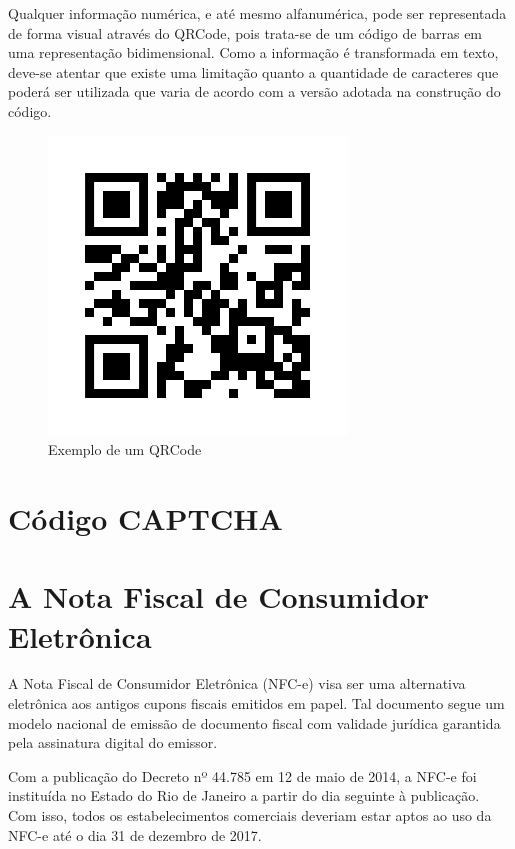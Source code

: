 Qualquer informação numérica, e até mesmo alfanumérica, pode ser representada de forma visual através do QRCode, pois trata-se de um código de barras em uma representação bidimensional. Como a informação é transformada em texto, deve-se atentar que existe uma limitação quanto a quantidade de caracteres que poderá ser utilizada que varia de acordo com a versão adotada na construção do código.

\begin{figure}[h]
    \centering
    \includegraphics[scale=0.5]{tcc/figures/exemplo-qrcode.png}
    \caption{Exemplo de um QRCode}
    \label{fig-exemplo-qrcode}
\end{figure}

\section{Código CAPTCHA}

\section{A Nota Fiscal de Consumidor Eletrônica}\label{secNfce}

A Nota Fiscal de Consumidor Eletrônica (NFC-e) visa ser uma alternativa eletrônica aos antigos cupons fiscais emitidos em papel. Tal documento segue um modelo nacional de emissão de documento fiscal com validade jurídica garantida pela assinatura digital do emissor.

Com a publicação do Decreto nº 44.785 em 12 de maio de 2014, a NFC-e foi instituída no Estado do Rio de Janeiro a partir do dia seguinte à publicação. Com isso, todos os estabelecimentos comerciais deveriam estar aptos ao uso da NFC-e até o dia 31 de dezembro de 2017.


